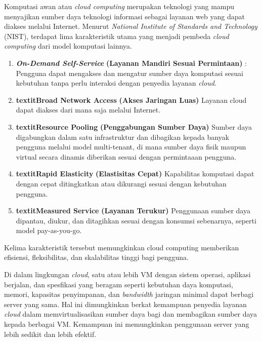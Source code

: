 Komputasi awan atau \textit{cloud computing} merupakan teknologi yang mampu menyajikan sumber daya teknologi informasi sebagai layanan web yang dapat diakses melalui Internet.
Menurut \textit{National Institute of Standards and Technology} (NIST), terdapat lima karakteristik utama yang menjadi pembeda \textit{cloud computing} dari model komputasi lainnya. 

\begin{enumerate}
  \item \textbf{\textit{{On-Demand Self-Service}}} \textbf{(Layanan Mandiri Sesuai Permintaan)} :
  Pengguna dapat mengakses dan mengatur sumber daya komputasi sesuai kebutuhan tanpa perlu interaksi dengan penyedia layanan \textit{cloud}.
  \item \textbf{textit{Broad Network Access}} \textbf{(Akses Jaringan Luas)}
  Layanan cloud dapat diakses dari mana saja melalui Internet.
  \item \textbf{textit{Resource Pooling}} \textbf{(Penggabungan Sumber Daya)}
  Sumber daya digabungkan dalam satu infrastruktur dan dibagikan kepada banyak pengguna melalui model multi-tenant, di mana sumber daya fisik maupun virtual secara dinamis diberikan sesuai dengan permintaaan pengguna.
  \item \textbf{textit{Rapid Elasticity}} \textbf{(Elastisitas Cepat)}
  Kapabilitas komputasi dapat dengan cepat ditingkatkan atau dikurangi sesuai dengan kebutuhan pengguna.
  \item \textbf{textit{Measured Service}} \textbf{(Layanan Terukur)}
  Penggunaan sumber daya dipantau, diukur, dan ditagihkan sesuai dengan konsumsi sebenarnya, seperti model pay-as-you-go.
\end{enumerate}

Kelima karakteristik tersebut memungkinkan cloud computing memberikan efisiensi, fleksibilitas, dan skalabilitas tinggi bagi pengguna. 

Di dalam lingkungan \textit{cloud}, satu atau lebih VM dengan sistem operasi, aplikasi berjalan, dan spesfikasi yang beragam seperti kebutuhan daya komputasi, memori, kapasitas penyimpanan, dan \textit{bandwidth} jaringan minimal dapat berbagi server yang sama. 
Hal ini dimungkinkan berkat kemampuan penyedia layanan \textit{cloud} dalam memvirtualisasikan sumber daya bagi dan membagikan sumber daya kepada berbagai VM. Kemampuan ini memungkinkan penggunaan server yang lebih sedikit dan lebih efektif. 



